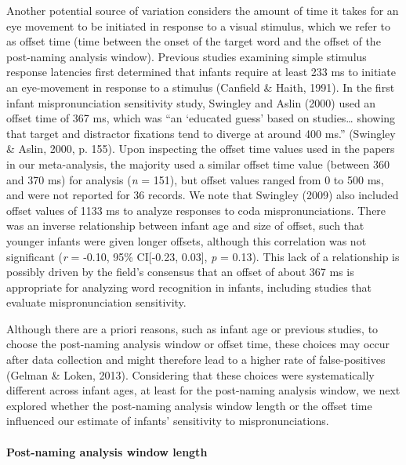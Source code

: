 \documentclass[man]{apa6}
\let\oldparagraph\paragraph
\renewcommand{\paragraph}[1]{\oldparagraph{#1}\mbox{}}
\begin{document}
Another potential source of variation considers the amount of time it takes for an eye movement to be initiated in response to a visual stimulus, which we refer to as offset time (time between the onset of the target word and the offset of the post-naming analysis window). Previous studies examining simple stimulus response latencies first determined that infants require at least 233 ms to initiate an eye-movement in response to a stimulus (Canfield \& Haith, 1991). In the first infant mispronunciation sensitivity study, Swingley and Aslin (2000) used an offset time of 367 ms, which was \enquote{an \enquote{educated guess} based on studies\ldots{} showing that target and distractor fixations tend to diverge at around 400 ms.} (Swingley \& Aslin, 2000, p. 155). Upon inspecting the offset time values used in the papers in our meta-analysis, the majority used a similar offset time value (between 360 and 370 ms) for analysis (\emph{n} = 151), but offset values ranged from 0 to 500 ms, and were not reported for 36 records. We note that Swingley (2009) also included offset values of 1133 ms to analyze responses to coda mispronunciations. There was an inverse relationship between infant age and size of offset, such that younger infants were given longer offsets, although this correlation was not significant (\emph{r} = -0.10, 95\% CI{[}-0.23, 0.03{]}, \emph{p} = 0.13). This lack of a relationship is possibly driven by the field's consensus that an offset of about 367 ms is appropriate for analyzing word recognition in infants, including studies that evaluate mispronunciation sensitivity.

Although there are a priori reasons, such as infant age or previous studies, to choose the post-naming analysis window or offset time, these choices may occur after data collection and might therefore lead to a higher rate of false-positives (Gelman \& Loken, 2013). Considering that these choices were systematically different across infant ages, at least for the post-naming analysis window, we next explored whether the post-naming analysis window length or the offset time influenced our estimate of infants' sensitivity to mispronunciations.

\hypertarget{post-naming-analysis-window-length}{%
\paragraph{Post-naming analysis window length}\label{post-naming-analysis-window-length}}
\end{document}
